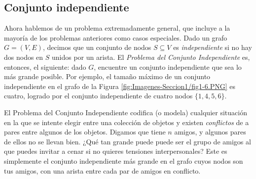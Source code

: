 \documentclass[a4paper, 12pt]{book}
\theoremstyle{dotless}
\begin{document}
\subsection*{Conjunto independiente}

Ahora hablemos de un problema extremadamente general, que incluye a la mayoría de los problemas anteriores como casos especiales. Dado un grafo $G=(V,E)$, decimos que un conjunto de nodos $S \subseteq V$ es \textit{independiente} si no hay dos nodos en $S$ unidos por un arista. El \textit{Problema del Conjunto Independiente} es, entonces, el siguiente: dado $G$, encuentre un conjunto independiente que sea lo más grande posible. Por ejemplo, el tamaño máximo de un conjunto independiente en el grafo de la Figura \ref{fig:Imagenes-Seccion1/fig1-6.PNG} es cuatro, logrado por el conjunto independiente de cuatro nodos $\{1,4,5,6\}$.


El Problema del Conjunto Independiente codifica (o modela) cualquier situación en la que se intente elegir entre una colección de objetos y existen \textit{conflictos} de a pares entre algunos de los objetos. Digamos que tiene $n$ amigos, y algunos pares de ellos no se llevan bien. ¿Qué tan grande puede puede ser el grupo de amigos al que puedes invitar a cenar si no quieres tensiones interpersonales? Este es simplemente el conjunto independiente más grande en el grafo cuyos nodos son tus amigos, con una arista entre cada par de amigos en conflicto.
\end{document}
